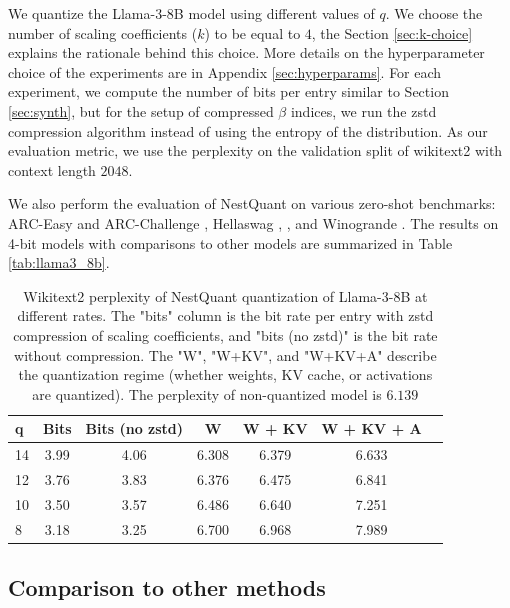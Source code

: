 \documentclass{article}
\newif\ifisicml
\theoremstyle{plain}
\theoremstyle{definition}
\theoremstyle{remark}
\begin{document}
We quantize the Llama-3-8B model \cite{grattafiori2024llama3herdmodels} using different values of $q$. We choose the number of scaling coefficients ($k$) to be equal to $4$, the Section \ref{sec:k-choice} explains the rationale behind this choice. More details on the hyperparameter choice of the experiments are in Appendix \ref{sec:hyperparams}. For each experiment, we compute the number of bits per entry similar to Section \ref{sec:synth}, but for the setup of compressed $\beta$ indices, we run the zstd compression algorithm instead of using the entropy of the distribution. As our evaluation metric, we use the perplexity on the validation split of wikitext2 with context length $2048$.

We also perform the evaluation of NestQuant on various zero-shot benchmarks: ARC-Easy and ARC-Challenge \cite{clark2018arc}, Hellaswag \cite{zellers2019}, \cite{bisk2019piqa}, and Winogrande \cite{sakaguchi2019winogrande}. The results on 4-bit models with comparisons to other models are summarized in Table \ref{tab:llama3_8b}.

\begin{table}
\centering
\scriptsize
\begin{tabular}{lcccccc}
    \toprule
\textbf{q}& \textbf{Bits} & \textbf{Bits (no zstd)} &  \textbf{W}&
\textbf{W + KV}&
\textbf{W + KV + A}\\    \midrule
    14 & 3.99& 4.06 & 6.308& 6.379& 6.633\\
    12 & 3.76& 3.83 & 6.376& 6.475& 6.841\\
    10 & 3.50& 3.57 & 6.486& 6.640& 7.251\\
    8 & 3.18& 3.25 & 6.700& 6.968& 7.989\\
    \bottomrule
\end{tabular}
\ifisicml\else\vspace{1em}\fi
\caption{Wikitext2 perplexity of NestQuant quantization of Llama-3-8B at different rates. The "bits" column is the bit rate per entry with zstd compression of scaling coefficients, and "bits (no zstd)" is the bit rate without compression. The "W", "W+KV", and "W+KV+A" describe the quantization regime (whether weights, KV cache, or activations are quantized). The perplexity of non-quantized model is $6.139$} 
\label{tab:llama3_ppl}
\end{table}


\subsection{Comparison to other methods}
\end{document}
